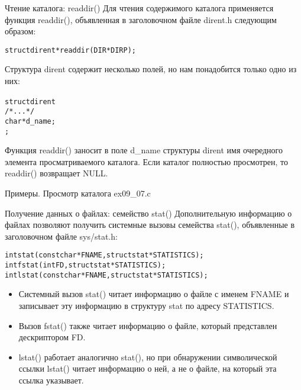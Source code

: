 \documentclass{beamer}
\begin{document}
\begin{frame}[fragile]{Чтение каталога: readdir()}
Для чтения содержимого каталога применяется функция readdir(), объявленная
в заголовочном файле dirent.h следующим образом:
\begin{alltt}
struct dirent * readdir (DIR * DIRP);
\end{alltt}
Структура dirent содержит несколько полей, но нам понадобится только одно из
них:
\begin{alltt}
struct dirent {
  /* ... */
  char * d\_name;
};
\end{alltt}
Функция readdir() заносит в поле d\_name структуры dirent имя очередного элемента просматриваемого каталога. Если каталог полностью просмотрен, то readdir() возвращает NULL.
\begin{block}{Примеры. Просмотр каталога}
ex09\_07.c
\end{block}
\end{frame}

\begin{frame}[fragile]{Получение данных о файлах: семейство stat()}
Дополнительную информацию о файлах позволяют получить системные вызовы семейства stat(), объявленные в заголовочном файле sys/stat.h:
\begin{alltt}
int stat (const char * FNAME, struct stat * STATISTICS);
int fstat (int FD, struct stat * STATISTICS);
int lstat (const char * FNAME, struct stat * STATISTICS);
\end{alltt}
\begin{itemize}
\item Системный вызов stat() читает информацию о файле с именем FNAME и записывает эту информацию в структуру stat по адресу STATISTICS. 
\item Вызов fstat() также читает информацию о файле, который представлен дескриптором FD. 
\item lstat() работает аналогично stat(), но при обнаружении символической ссылки lstat() читает информацию о ней, а не о файле, на который эта ссылка указывает.
\end{itemize}
\end{frame}
\end{document}
